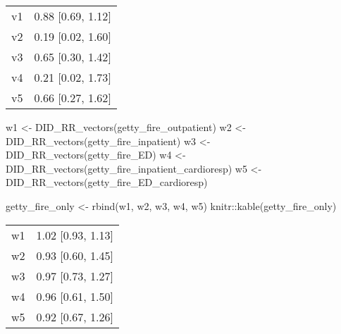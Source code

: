 \documentclass[
]{article}
\newenvironment{Shaded}{\begin{snugshade}}{\end{snugshade}}
\newcommand{\FunctionTok}[1]{\textcolor[rgb]{0.00,0.00,0.00}{#1}}
\newcommand{\NormalTok}[1]{#1}
\newcommand{\OtherTok}[1]{\textcolor[rgb]{0.56,0.35,0.01}{#1}}
\newcommand{\SpecialCharTok}[1]{\textcolor[rgb]{0.00,0.00,0.00}{#1}}
\begin{document}
\begin{longtable}[]{@{}ll@{}}
\toprule()
\endhead
v1 & 0.88 {[}0.69, 1.12{]} \\
v2 & 0.19 {[}0.02, 1.60{]} \\
v3 & 0.65 {[}0.30, 1.42{]} \\
v4 & 0.21 {[}0.02, 1.73{]} \\
v5 & 0.66 {[}0.27, 1.62{]} \\
\bottomrule()
\end{longtable}

\begin{Shaded}
\begin{Highlighting}[]
\NormalTok{w1 }\OtherTok{\textless{}{-}} \FunctionTok{DID\_RR\_vectors}\NormalTok{(getty\_fire\_outpatient)}
\NormalTok{w2 }\OtherTok{\textless{}{-}} \FunctionTok{DID\_RR\_vectors}\NormalTok{(getty\_fire\_inpatient)}
\NormalTok{w3 }\OtherTok{\textless{}{-}} \FunctionTok{DID\_RR\_vectors}\NormalTok{(getty\_fire\_ED)}
\NormalTok{w4 }\OtherTok{\textless{}{-}} \FunctionTok{DID\_RR\_vectors}\NormalTok{(getty\_fire\_inpatient\_cardioresp)}
\NormalTok{w5 }\OtherTok{\textless{}{-}} \FunctionTok{DID\_RR\_vectors}\NormalTok{(getty\_fire\_ED\_cardioresp)}

\NormalTok{getty\_fire\_only }\OtherTok{\textless{}{-}} \FunctionTok{rbind}\NormalTok{(w1, w2, w3, w4, w5)}
\NormalTok{knitr}\SpecialCharTok{::}\FunctionTok{kable}\NormalTok{(getty\_fire\_only)}
\end{Highlighting}
\end{Shaded}

\begin{longtable}[]{@{}ll@{}}
\toprule()
\endhead
w1 & 1.02 {[}0.93, 1.13{]} \\
w2 & 0.93 {[}0.60, 1.45{]} \\
w3 & 0.97 {[}0.73, 1.27{]} \\
w4 & 0.96 {[}0.61, 1.50{]} \\
w5 & 0.92 {[}0.67, 1.26{]} \\
\bottomrule()
\end{longtable}
\end{document}
